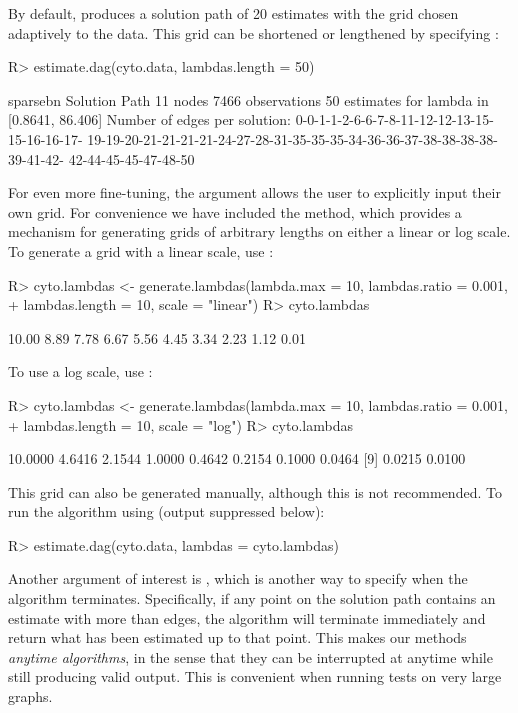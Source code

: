 \documentclass[article]{jss}
\renewcommand{\|}{\,|\,}
\begin{document}
By default,  produces a solution path of 20 estimates with the grid chosen adaptively to the data. This grid can be shortened or lengthened by specifying :
%
\begin{CodeChunk}
\begin{CodeInput}
R> estimate.dag(cyto.data, lambdas.length = 50)
\end{CodeInput}
\begin{CodeOutput}
sparsebn Solution Path
 11 nodes
 7466 observations
 50 estimates for lambda in [0.8641, 86.406]
 Number of edges per solution: 0-0-1-1-2-6-6-7-8-11-12-12-13-15-15-16-16-17-
 19-19-20-21-21-21-21-24-27-28-31-35-35-35-34-36-36-37-38-38-38-38-39-41-42-
 42-44-45-45-47-48-50
\end{CodeOutput}
\end{CodeChunk}
%
For even more fine-tuning, the  argument allows the user to explicitly input their own grid. For convenience we have included the  method, which provides a mechanism for generating grids of arbitrary lengths on either a linear or log scale. To generate a grid with a linear scale, use :
%
\begin{CodeChunk}
\begin{CodeInput}
R> cyto.lambdas <- generate.lambdas(lambda.max = 10, lambdas.ratio = 0.001, 
+    lambdas.length = 10, scale = "linear")
R> cyto.lambdas
\end{CodeInput}
\begin{CodeOutput}
[1] 10.00  8.89  7.78  6.67  5.56  4.45  3.34  2.23  1.12  0.01
\end{CodeOutput}
\end{CodeChunk}
%
To use a log scale, use :
%
\begin{CodeChunk}
\begin{CodeInput}
R> cyto.lambdas <- generate.lambdas(lambda.max = 10, lambdas.ratio = 0.001, 
+    lambdas.length = 10, scale = "log")
R> cyto.lambdas
\end{CodeInput}
\begin{CodeOutput}
[1] 10.0000  4.6416  2.1544  1.0000  0.4642  0.2154  0.1000  0.0464
[9]  0.0215  0.0100
\end{CodeOutput}
\end{CodeChunk}
%
This grid can also be generated manually, although this is not recommended. To run the algorithm using  (output suppressed below):
%
\begin{CodeChunk}
\begin{CodeInput}
R> estimate.dag(cyto.data, lambdas = cyto.lambdas)
\end{CodeInput}
\end{CodeChunk}
%
Another argument of interest is , which is another way to specify when the algorithm terminates. Specifically, if any point on the solution path contains an estimate with more than  edges, the algorithm will terminate immediately and return what has been estimated up to that point. This makes our methods \emph{anytime algorithms}, in the sense that they can be interrupted at anytime while still producing valid output. This is convenient when running tests on very large graphs.
\end{document}
